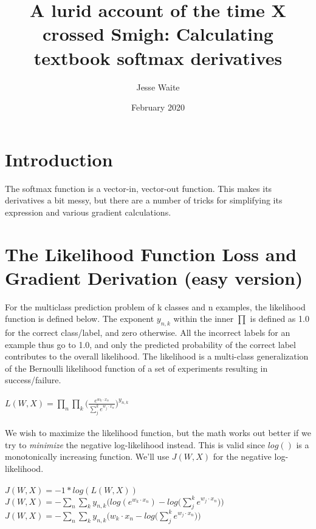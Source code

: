 \documentclass{article}
\title{A lurid account of the time X crossed Smigh: Calculating textbook softmax derivatives}
\author{Jesse Waite}
\date{February 2020}
\begin{document}
\maketitle

\section{Introduction}
The softmax function is a vector-in, vector-out function. This makes its derivatives a bit messy, but there are a number of tricks for simplifying its expression and various gradient calculations.

\section{The Likelihood Function Loss and Gradient Derivation (easy version)}

For the multiclass prediction problem of k classes and n examples, the likelihood function is defined below. The exponent $y_{n,k}$ within the inner $\prod $ is defined as 1.0 for the correct class/label, and zero otherwise. All the incorrect labels for an example thus go to 1.0, and only the predicted probability of the correct label contributes to the overall likelihood. The likelihood is a multi-class generalization of the Bernoulli likelihood function of a set of experiments resulting in success/failure. \\ \\

$L(W,X) = \prod_{n} \prod_{k} \Big(\frac{e^{w_{k} \cdot x_{n}}}{\sum_{j}^{k} e^{w_{j} \cdot x_{n}}}\Big)^{y_{n,k}}$ 
\\ \\

We wish to maximize the likelihood function, but the math works out better if we try to \textit{minimize} the negative log-likelihood instead. This is valid since $log()$ is a monotonically increasing function. We'll use $J(W,X)$ for the negative log-likelihood.
\\ \\

$J(W,X) = -1 * log(L(W,X)) $ \\

$J(W,X) = - \sum_{n} \sum_{k} y_{n,k}\Big(log(e^{w_{k} \cdot x_{n}}) - log\big(\sum_{j}^{k} e^{w_{j} \cdot x_{n}}\big)\Big)$  \\

$J(W,X) = - \sum_{n} \sum_{k} y_{n,k}\Big(w_{k} \cdot x_{n} - log\big(\sum_{j}^{k} e^{w_{j} \cdot x_{n}}\big)\Big)$ \\
\end{document}
